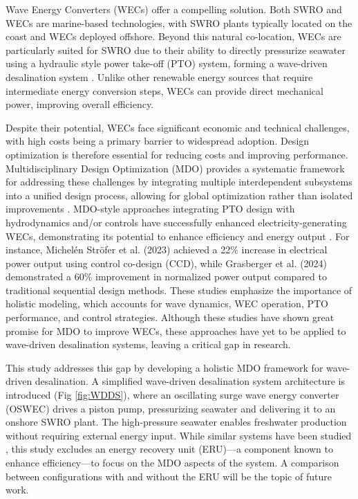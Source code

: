 \documentclass[twocolumn,10pt]{asme2e}
\begin{document}
Wave Energy Converters (WECs) offer a compelling solution. Both SWRO and WECs are marine-based technologies, with SWRO plants typically located on the coast and WECs deployed offshore. Beyond this natural co-location, WECs are particularly suited for SWRO \cite{blue_econ} due to their ability to directly pressurize seawater using a hydraulic style power take-off (PTO) system, forming a wave-driven desalination system \cite{Davies2005}. Unlike other renewable energy sources that require intermediate energy conversion steps, WECs can provide direct mechanical power, improving overall efficiency. 

Despite their potential, WECs face significant economic and technical challenges, with high costs being a primary barrier to widespread adoption. Design optimization is therefore essential for reducing costs and improving performance. Multidisciplinary Design Optimization (MDO) provides a systematic framework for addressing these challenges by integrating multiple interdependent subsystems into a unified design process, allowing for global optimization rather than isolated improvements \cite{Sobieski}. MDO-style approaches integrating PTO design with hydrodynamics and/or controls have successfully enhanced electricity-generating WECs, demonstrating its potential to enhance efficiency and energy output \cite{Stroefer2023,PenaSanchez2022,Rosati2023,Grasberger2024}. For instance, Michelén Ströfer et al. (2023) achieved a 22\% increase in electrical power output using control co-design (CCD), while Grasberger et al. (2024) demonstrated a 60\% improvement in normalized power output compared to traditional sequential design methods. These studies emphasize the importance of holistic modeling, which accounts for wave dynamics, WEC operation, PTO performance, and control strategies. Although these studies have shown great promise for MDO to improve WECs, these approaches have yet to be applied to wave-driven desalination systems, leaving a critical gap in research. 

This study addresses this gap by developing a holistic MDO framework for wave-driven desalination. A simplified wave-driven desalination system architecture is introduced (Fig \ref{fig:WDDS}), where an oscillating surge wave energy converter (OSWEC) drives a piston pump, pressurizing seawater and delivering it to an onshore SWRO plant. The high-pressure seawater enables freshwater production without requiring external energy input. While similar systems have been studied \cite{Yu2018,Suchithra2022,Mi2023,Simmons2024}, this study excludes an energy recovery unit (ERU)---a component known to enhance efficiency---to focus on the MDO aspects of the system. A comparison between configurations with and without the ERU will be the topic of future work.
\end{document}

